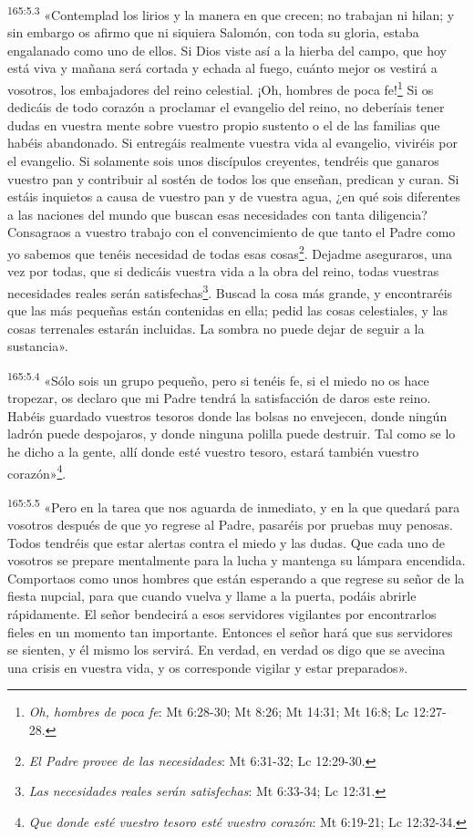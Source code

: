 \par
\textsuperscript{165:5.3} «Contemplad los lirios y la manera en que crecen; no trabajan ni hilan; y sin embargo os afirmo que ni siquiera Salomón, con toda su gloria, estaba engalanado como uno de ellos. Si Dios viste así a la hierba del campo, que hoy está viva y mañana será cortada y echada al fuego, cuánto mejor os vestirá a vosotros, los embajadores del reino celestial. ¡Oh, hombres de poca fe!\footnote{\textit{Oh, hombres de poca fe}: Mt 6:28-30; Mt 8:26; Mt 14:31; Mt 16:8; Lc 12:27-28.} Si os dedicáis de todo corazón a proclamar el evangelio del reino, no deberíais tener dudas en vuestra mente sobre vuestro propio sustento o el de las familias que habéis abandonado. Si entregáis realmente vuestra vida al evangelio, viviréis por el evangelio. Si solamente sois unos discípulos creyentes, tendréis que ganaros vuestro pan y contribuir al sostén de todos los que enseñan, predican y curan. Si estáis inquietos a causa de vuestro pan y de vuestra agua, ¿en qué sois diferentes a las naciones del mundo que buscan esas necesidades con tanta diligencia? Consagraos a vuestro trabajo con el convencimiento de que tanto el Padre como yo sabemos que tenéis necesidad de todas esas cosas\footnote{\textit{El Padre provee de las necesidades}: Mt 6:31-32; Lc 12:29-30.}. Dejadme aseguraros, una vez por todas, que si dedicáis vuestra vida a la obra del reino, todas vuestras necesidades reales serán satisfechas\footnote{\textit{Las necesidades reales serán satisfechas}: Mt 6:33-34; Lc 12:31.}. Buscad la cosa más grande, y encontraréis que las más pequeñas están contenidas en ella; pedid las cosas celestiales, y las cosas terrenales estarán incluidas. La sombra no puede dejar de seguir a la sustancia».

\par
\textsuperscript{165:5.4} «Sólo sois un grupo pequeño, pero si tenéis fe, si el miedo no os hace tropezar, os declaro que mi Padre tendrá la satisfacción de daros este reino. Habéis guardado vuestros tesoros donde las bolsas no envejecen, donde ningún ladrón puede despojaros, y donde ninguna polilla puede destruir. Tal como se lo he dicho a la gente, allí donde esté vuestro tesoro, estará también vuestro corazón»\footnote{\textit{Que donde esté vuestro tesoro esté vuestro corazón}: Mt 6:19-21; Lc 12:32-34.}.

\par
\textsuperscript{165:5.5} «Pero en la tarea que nos aguarda de inmediato, y en la que quedará para vosotros después de que yo regrese al Padre, pasaréis por pruebas muy penosas. Todos tendréis que estar alertas contra el miedo y las dudas. Que cada uno de vosotros se prepare mentalmente para la lucha y mantenga su lámpara encendida. Comportaos como unos hombres que están esperando a que regrese su señor de la fiesta nupcial, para que cuando vuelva y llame a la puerta, podáis abrirle rápidamente. El señor bendecirá a esos servidores vigilantes por encontrarlos fieles en un momento tan importante. Entonces el señor hará que sus servidores se sienten, y él mismo los servirá. En verdad, en verdad os digo que se avecina una crisis en vuestra vida, y os corresponde vigilar y estar preparados».

